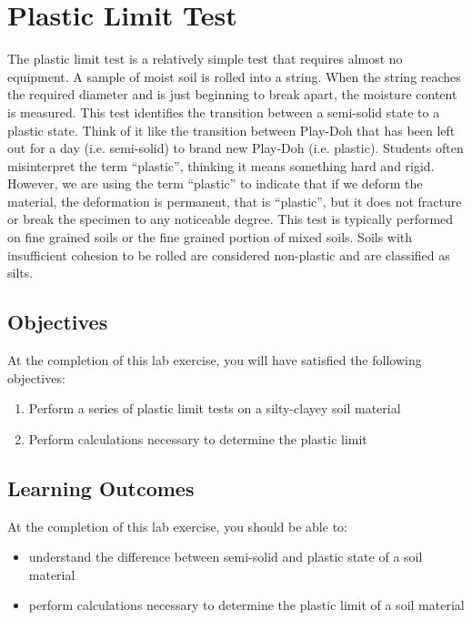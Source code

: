 \documentclass[12pt]{article}
\begin{document}
\section{Plastic Limit Test}
\label{sec:intro}
\normalsize 
The plastic limit test is a relatively simple test that requires almost no equipment. A sample of moist soil is rolled into a string. When the string reaches the required diameter and is just beginning to break apart, the moisture content is measured. This test identifies the transition between a semi-solid state to a plastic state. Think of it like the transition between Play-Doh\textregistered{} that has been left out for a day (i.e. semi-solid) to brand new Play-Doh\textregistered{} (i.e. plastic). Students often misinterpret the term ``plastic'', thinking it means something hard and rigid. However, we are using the term ``plastic'' to indicate that if we deform the material, the deformation is permanent, that is ``plastic'', but it does not fracture or break the specimen to any noticeable degree. This test is typically performed on fine grained soils or the fine grained portion of mixed soils. Soils with insufficient cohesion to be rolled are considered non-plastic and are classified as silts.

\subsection{Objectives}
\label{ssec:headingscap}
At the completion of this lab exercise, you will have satisfied the following objectives:
\begin{enumerate}
    \item Perform a series of plastic limit tests on a silty-clayey soil material
    \item Perform calculations necessary to determine the plastic limit
\end{enumerate}

\subsection{Learning Outcomes}
At the completion of this lab exercise, you should be able to:
\begin{itemize}
    \item understand the difference between semi-solid and plastic state of a soil material
    \item perform calculations necessary to determine the plastic limit of a soil material
\end{itemize}
\end{document}
